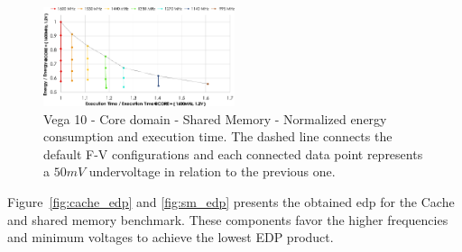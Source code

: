 \begin{figure}[htb]
  \centering
  \includegraphics[width=0.5\textwidth]{Figures/GPU_characterization/SharedMemory_behaviour.pdf}
  \caption{Vega 10 - Core domain - Shared Memory - Normalized energy consumption and execution time. The dashed line connects the default F-V configurations and each connected data point represents a $50mV$ undervoltage in relation to the previous one.}
  \label{fig:sm_behaviour}
\end{figure}



Figure~\ref{fig:cache_edp} and \ref{fig:sm_edp} presents the obtained \acrshort{edp} for the Cache and shared memory benchmark. These components favor the higher frequencies and minimum voltages to achieve the lowest EDP product.


